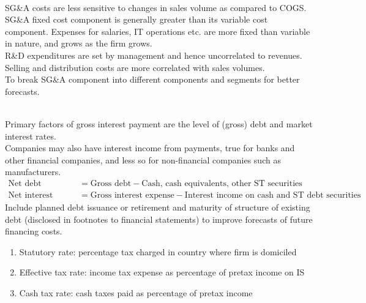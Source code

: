\begin{remark} \\
SG\&A costs are less sensitive to changes in sales volume as compared to COGS. \\
SG\&A fixed cost component is generally greater than its variable cost component. Expenses for salaries, IT operations etc. are more fixed than variable in nature, and grows as the firm grows.\\
R\&D expenditures are set by management and hence uncorrelated to revenues.\\
Selling and distribution costs are more correlated with sales volumes.\\
To break SG\&A component into different components and segments for better forecasts.
\end{remark}

\begin{remark} \\
Primary factors of gross interest payment are the level of (gross) debt and market interest rates.\\
Companies may also have interest income from payments, true for banks and other financial companies, and less so for non-financial companies such as manufacturers.
\begin{align}
\text{Net debt} &= \text{Gross debt} - \text{Cash, cash equivalents, other ST securities} \nonumber \\
\text{Net interest expense} &= \text{Gross interest expense} - \text{Interest income on cash and ST debt securities} \nonumber
\end{align}
Include planned debt issuance or retirement and maturity of structure of existing debt (disclosed in footnotes to financial statements) to improve forecasts of future financing costs.
\end{remark}

\begin{remark} 
\begin{enumerate}[label=\roman*.]
\setlength{\itemsep}{0pt}
\item Statutory rate: percentage tax charged in country where firm is domiciled
\item Effective tax rate: income tax expense as percentage of pretax income on IS
\item Cash tax rate: cash taxes paid as percentage of pretax income
\end{enumerate}
\end{remark}

